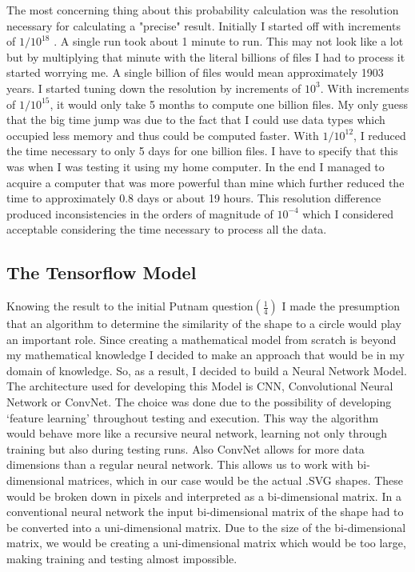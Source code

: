 \documentclass[9pt,onecolumn,oneside]{osajnl}
\begin{document}
	The most concerning thing about this probability calculation was the resolution necessary for calculating a "precise" result. Initially I started off with increments of \(1/10^{18}\) . A single run took about 1 minute to run. This may not look like a lot but by multiplying that minute with the literal billions of files I had to process it started worrying me. A single billion of files would mean approximately 1903  years. I started tuning down the resolution by increments of \(10^{3}\). With increments of \(1/10^{15}\), it would only take 5 months to compute one billion files. My only guess that the big time jump was due to the fact that I could use data types which occupied less memory and thus could be computed faster. With \(1/10^{12}\), I reduced the time necessary to only 5 days for one billion files. I have to specify that this was when I was testing it using my home computer. In the end I managed to acquire a computer that was more powerful than mine which further reduced the time to approximately 0.8 days or about 19 hours. This resolution difference produced inconsistencies in the orders of magnitude of \(10^{-4}\) which I considered acceptable considering the time necessary to process all the data.
    


\subsection{The Tensorflow Model}


	Knowing the result to the initial Putnam question\((\frac{1}{4})\) I made the presumption that an algorithm to determine the similarity of the shape to a circle would play an important role. Since creating a mathematical model from scratch is beyond my mathematical knowledge I decided to make an approach that would be in my domain of knowledge. So, as a result, I decided to build a Neural Network Model. The architecture used for developing this Model is CNN, Convolutional Neural Network or ConvNet. The choice was done due to the possibility of developing ‘feature learning’ throughout testing and execution. This way the algorithm would behave more like a recursive neural network, learning not only through training but also during testing runs. Also ConvNet allows for more data dimensions than a regular neural network. This allows us to work with bi-dimensional matrices, which in our case would be the actual .SVG shapes. These would be broken down in pixels and interpreted as a bi-dimensional matrix. In a conventional neural network the input bi-dimensional matrix of the shape had to be converted into a uni-dimensional matrix. Due to the size of the bi-dimensional matrix, we would be creating a uni-dimensional matrix which would be too large, making training and testing almost impossible.
\end{document}
